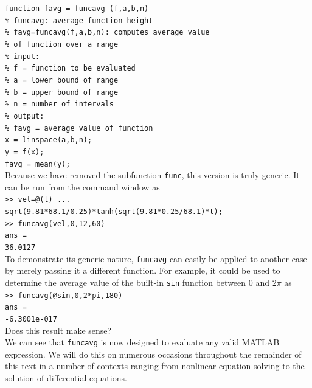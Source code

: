 \documentclass[../main.tex]{subfiles}
\begin{document}
\begin{example}
    \texttt{function favg = funcavg (f,a,b,n)\\
    \indent \% funcavg: average function height\\
    \indent \% \hspace{2mm}favg=funcavg(f,a,b,n): computes average value\\
    \indent \% \indent\indent of function over a range\\
    \indent \% input:\\
    \indent \% \hspace{2mm}f = function to be evaluated\\
    \indent \% \hspace{2mm}a = lower bound of range\\
    \indent \% \hspace{2mm}b = upper bound of range\\
    \indent \% \hspace{2mm}n = number of intervals\\
    \indent \% output:\\
    \indent \% \hspace{2mm}favg = average value of function\\
    \indent x = linspace(a,b,n);\\
    \indent y = f(x);\\
    \indent favg = mean(y);}\\

    \noindent Because we have removed the subfunction \texttt{func}, this version is truly generic. It can be run
    from the command window as\\

    \texttt{>> vel=@(t) ...\\
    \indent sqrt(9.81*68.1/0.25)*tanh(sqrt(9.81*0.25/68.1)*t);\\
    \indent >> funcavg(vel,0,12,60)\\
    \indent ans =\\
    \indent\hspace{2mm} 36.0127}\\

    To demonstrate its generic nature, \texttt{funcavg} can easily be applied to another case by
merely passing it a different function. For example, it could be used to determine the average
value of the built-in \texttt{sin} function between 0 and $2\pi$ as\\

    \texttt{>> funcavg(@sin,0,2*pi,180)\\
    \indent ans =\\
    \indent\hspace{2mm} -6.3001e-017}\\

    Does this result make sense?\\
    \indent We can see that \texttt{funcavg} is now designed to evaluate any valid MATLAB expression.
    We will do this on numerous occasions throughout the remainder of this text in a
    number of contexts ranging from nonlinear equation solving to the solution of differential
    equations.\\

\end{example}
\end{document}
